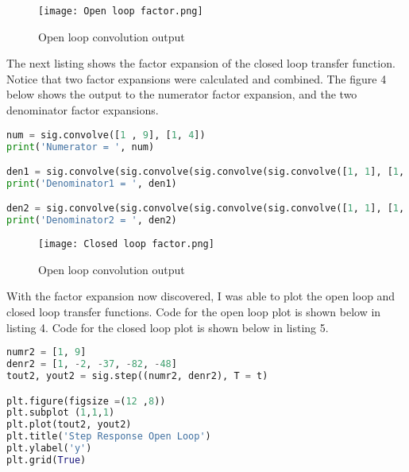 \documentclass[12pt]{report}
\begin{document}
\begin{figure}[h!]
    \centering
    \texttt{[image: Open loop factor.png]}
    \caption{Open loop convolution output}
    \label{Figure x:}
\end{figure}
\hspace{\parindent}The next listing shows the factor expansion of the closed loop transfer function. Notice that two factor expansions were calculated and combined. The figure 4 below shows the output to the numerator factor expansion, and the two denominator factor expansions.
\begin{lstlisting}[language=Python, caption=Closed loop convolution code]
num = sig.convolve([1 , 9], [1, 4])
print('Numerator = ', num)

den1 = sig.convolve(sig.convolve(sig.convolve(sig.convolve([1, 1], [1, 3]), [1, -8]), [1, 2]),[1, 4])
print('Denominator1 = ', den1)

den2 = sig.convolve(sig.convolve(sig.convolve(sig.convolve([1, 1], [1, 3]), [1, 12]), [1, 9]),[1, 14])
print('Denominator2 = ', den2)
\end{lstlisting}
\begin{figure}[h!]
    \centering
    \texttt{[image: Closed loop factor.png]}
    \caption{Open loop convolution output}
    \label{Figure x:}
\end{figure}
\hspace{\parindent}With the factor expansion now discovered, I was able to plot the open loop and closed loop transfer functions. Code for the open loop plot is shown below in listing 4. Code for the closed loop plot is shown below in listing 5.
\begin{lstlisting}[language=Python, caption=Step Response Open Loop Code]
numr2 = [1, 9]
denr2 = [1, -2, -37, -82, -48]
tout2, yout2 = sig.step((numr2, denr2), T = t)

plt.figure(figsize =(12 ,8))
plt.subplot (1,1,1)
plt.plot(tout2, yout2)
plt.title('Step Response Open Loop')
plt.ylabel('y')
plt.grid(True)
\end{lstlisting}
\end{document}
